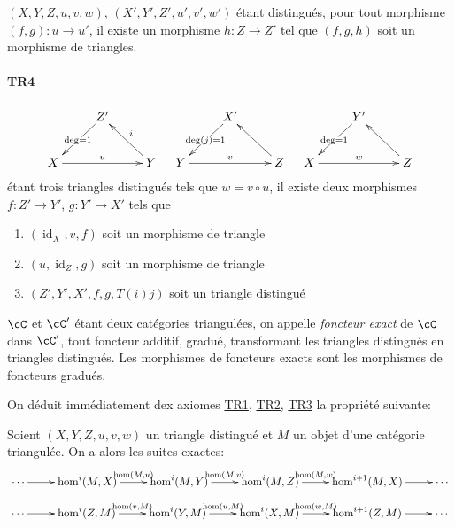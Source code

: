 $(X,Y,Z,u,v,w)$, $(X',Y',Z',u',v',w')$ étant distingués, pour tout 
morphisme $(f,g):u\to u'$, il existe un morphisme $h:Z\to Z'$ tel que $(f,g,h)$ 
soit un morphisme de triangles. 


\paragraph{TR4}
\label{VIII:TR4}

\[\xymatrix{
  & Z' \ar[dl]|{\deg=1} \\
  X \ar[rr]^-u 
    & & Y \ar[ul]_-i 
}\quad
\xymatrix{
  & X' \ar[dl]|{\deg(j)=1} \\
  Y \ar[rr]^-v 
    & & Z \ar[ul] 
}\quad
\xymatrix{
  & Y' \ar[dl]|{\deg=1} \\
  X \ar[rr]^-w 
    & & Z \ar[ul] 
}\]
étant trois triangles distingués tels que $w=v\circ u$, il existe deux 
morphismes $f:Z'\to Y'$, $g:Y' \to X'$ tels que 
\begin{enumerate}
  \item $(\operatorname{id}_X, v, f)$ soit un morphisme de triangle 
  \item $(u,\operatorname{id}_Z,g)$ soit un morphisme de triangle 
  \item $(Z',Y',X',f,g,T(i) j)$ soit un triangle distingué
\end{enumerate}

$\cC$ et $\cC'$ étant deux catégories triangulées, on appelle 
\emph{foncteur exact} de $\cC$ dans $\cC'$, tout foncteur additif, gradué, 
transformant les triangles distingués en triangles distingués. Les 
morphismes de foncteurs exacts sont les morphismes de foncteurs gradués. 

On déduit immédiatement dex axiomes \hyperref[VIII:TR1]{TR1}, 
\hyperref[VIII:TR2]{TR2}, \hyperref[VIII:TR3]{TR3} la propriété suivante: 





\begin{proposition}\label{VIII:1-1-2}
Soient $(X,Y,Z,u,v,w)$ un triangle distingué et $M$ un objet d'une 
catégorie triangulée. On a alors les suites exactes: 
\[\xymatrix{
  \cdots \ar[r] 
    & \hom^i(M,X) \ar[r]^-{\hom(M,u)} 
    & \hom^i(M,Y) \ar[r]^-{\hom(M,v)} 
    & \hom^i(M,Z) \ar[r]^-{\hom(M,w)} 
    & \hom^{i+1}(M,X) \ar[r] 
    & \cdots
}\]
\[\xymatrix{
  \cdots \ar[r] 
    & \hom^i(Z,M) \ar[r]^-{\hom(v,M)} 
    & \hom^i(Y,M) \ar[r]^-{\hom(u,M)} 
    & \hom^i(X,M) \ar[r]^-{\hom(w,M)} 
    & \hom^{i+1}(Z,M) \ar[r] 
    & \cdots
}\]
\end{proposition}

